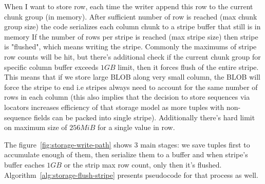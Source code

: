 When I want to store row, each time the writer append this row to the current chunk group (in memory).
After sufficient number of row is reached (max chunk group size) the code serializes each column chunk to a stripe buffer that still is in memory
If the number of rows per stripe is reached (max stripe size) then stripe is "flushed", which means writing the stripe.
Commonly the maximums of stripe row counts will be hit, but there's additional check if the current chunk group for specific column buffer exceeds $1GB$ limit, then it forces flush of the entire stripe.
This means that if we store large BLOB along very small column, the BLOB will force the stripe to end i.e stripes always need to account for the same number of rows in each column (this also implies that the decision to store sequences via locators increases efficiency of that storage model as more tuples with non-sequence fields can be packed into single stripe).
Additionally there's hard limit on maximum size of $256MiB$ for a single value in row.


The figure~\ref{fig:storage-write-path} shows 3 main stages: we save tuples first to accumulate enough of them, then serialize them to a buffer and when stripe's buffer eaches $1GB$ or the strip max row count, only then it's flushed.
Algorithm~\ref{alg:storage-flush-stripe} presents pseudocode for that process as well.

